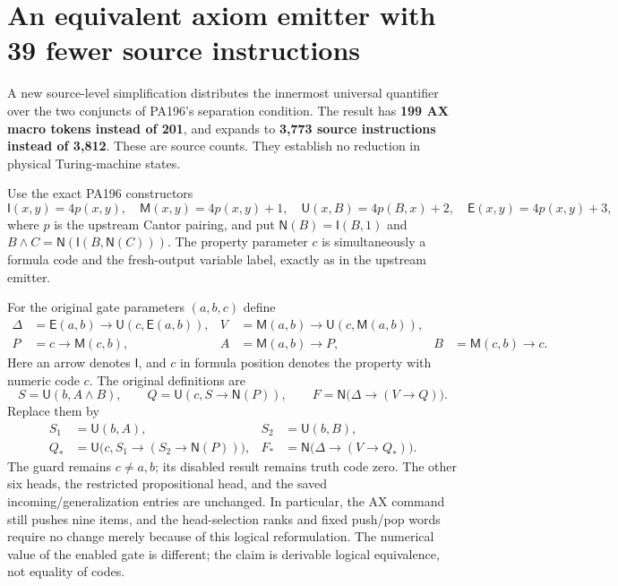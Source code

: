 \section{An equivalent axiom emitter with 39 fewer source instructions}
\label{sec:distributed-gate}
\begingroup
\newcommand{\Imp}{\mathsf I}
\newcommand{\Mem}{\mathsf M}
\newcommand{\All}{\mathsf U}
\newcommand{\Eq}{\mathsf E}
\newcommand{\Neg}{\mathsf N}

A new source-level simplification distributes the innermost universal
quantifier over the two conjuncts of PA196's separation condition. The
result has \textbf{199 AX macro tokens instead of 201}, and expands to
\textbf{3,773 source instructions instead of 3,812}. These are source
counts. They establish no reduction in physical Turing-machine states.

Use the exact PA196 constructors
\[
 \Imp(x,y)=4p(x,y),\quad
 \Mem(x,y)=4p(x,y)+1,\quad
 \All(x,B)=4p(B,x)+2,\quad
 \Eq(x,y)=4p(x,y)+3,
\]
where $p$ is the upstream Cantor pairing, and put
$\Neg(B)=\Imp(B,1)$ and
$B\wedge C=\Neg(\Imp(B,\Neg(C)))$.
The property parameter $c$ is simultaneously a formula code and the
fresh-output variable label, exactly as in the upstream emitter.

For the original gate parameters $(a,b,c)$ define
\begin{align*}
 \Delta&=\Eq(a,b)\to\All(c,\Eq(a,b)), &
 V&=\Mem(a,b)\to\All(c,\Mem(a,b)),\\
 P&=c\to\Mem(c,b), &
 A&=\Mem(a,b)\to P, &
 B&=\Mem(c,b)\to c.
\end{align*}
Here an arrow denotes $\Imp$, and $c$ in formula position denotes the
property with numeric code $c$. The original definitions are
\[
 S=\All(b,A\wedge B),\qquad
 Q=\All(c,S\to\Neg(P)),\qquad
 F=\Neg\bigl(\Delta\to(V\to Q)\bigr).
\]
Replace them by
\begin{align*}
 S_1&=\All(b,A), & S_2&=\All(b,B),\\
 Q_*&=\All\bigl(c,S_1\to(S_2\to\Neg(P))\bigr), &
 F_*&=\Neg\bigl(\Delta\to(V\to Q_*)\bigr).
\end{align*}
The guard remains $c\ne a,b$; its disabled result remains truth code zero.
The other six heads, the restricted propositional head, and the saved
incoming/generalization entries are unchanged. In particular, the AX
command still pushes nine items, and the head-selection ranks and
fixed push/pop words require no change merely because of this logical
reformulation. The numerical value of the enabled gate is different;
the claim is derivable logical equivalence, not equality of codes.

